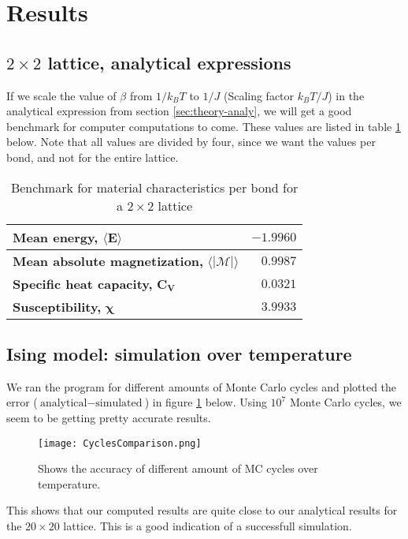 \documentclass[../main.tex]{subfiles}
\begin{document}
\section{Results}
\subsection{$2 \times 2$ lattice, analytical expressions}
If we scale the value of $\beta$ from $1/k_BT$ to $1/J$ (Scaling factor $k_B T/J$) in the analytical expression from section \ref{sec:theory-analy}, we will get a good benchmark for computer computations to come. These values are listed in table \ref{tab:2x2spinsEnergiesMags} below. Note that all values are divided by four, since we want the values per bond, and not for the entire lattice.
\begin{table}[!h]
\begin{center}
  \begin{tabular}{| l | r |}
    \hline
    \textbf{Mean energy,} $\mathbf{\langle E \rangle}$ & $-1.9960$  \\
    \hline
    \textbf{Mean absolute magnetization,} $\mathbf{\langle |\mathcal{M}| \rangle}$ & $0.9987$ \\
    \hline
    \textbf{Specific heat capacity,} $\mathbf{C_V}$ & $0.0321$\\
    \hline
    \textbf{Susceptibility,} $\mathbf \chi$ & $3.9933$ \\
    \hline
  \end{tabular}
  \caption{Benchmark for material characteristics per bond for a $2 \times 2$ lattice}
  \label{tab:2x2spinsEnergiesMags}
\end{center}
\end{table}
\FloatBarrier

\subsection{Ising model: simulation over temperature} \label{sec:res-compareanalytical}
We ran the program for different amounts of Monte Carlo cycles and plotted the error ($\text{analytical} - \text{simulated}$) in figure \ref{fig:results-MCplot} below. Using $10^7$ Monte Carlo cycles, we seem to be getting pretty accurate results.

\begin{figure}[!h]
  \texttt{[image: CyclesComparison.png]}
  \caption{Shows the accuracy of different amount of MC cycles over temperature.}
  \label{fig:results-MCplot}
\end{figure}
\FloatBarrier
This shows that our computed results are quite close to our analytical results for the $20\times 20$ lattice. This is a good indication of a successfull simulation.
\end{document}
